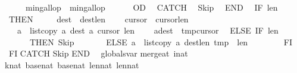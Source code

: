 \begin{isabellebody}
\ \ \ \ \ \ {\isasymacute}min{\isacharunderscore}gallop\ {\isacharcolon}{\isacharequal}{\isacharequal}\ {\isasymacute}min{\isacharunderscore}gallop\ {\isacharplus}\ {}\isanewline
\ \ \ \ OD\isanewline
\ \ CATCH\isanewline
\ \ Skip\isanewline
\ \ END{\isacharsemicolon}{\isacharsemicolon}\isanewline
\ \ IF\ {\isasymacute}len{}\ {\isacharequal}\ {}\isanewline
\ \ THEN\ \isanewline
\ \ \ \ {\isasymacute}dest\ {\isacharcolon}{\isacharequal}{\isacharequal}\ {\isasymacute}dest{\isacharminus}{\isasymacute}len{}{\isacharsemicolon}{\isacharsemicolon}\isanewline
\ \ \ \ {\isasymacute}cursor{}\ {\isacharcolon}{\isacharequal}{\isacharequal}\ {\isasymacute}cursor{}{\isacharminus}{\isasymacute}len{}{\isacharsemicolon}{\isacharsemicolon}\isanewline
\ \ \ \ {\isasymacute}a\ {\isacharcolon}{\isacharequal}{\isacharequal}\ list{\isacharunderscore}copy\ {\isasymacute}a\ {\isacharparenleft}{\isasymacute}dest{\isacharplus}{}{\isacharparenright}\ {\isasymacute}a\ {\isacharparenleft}{\isasymacute}cursor{}{\isacharplus}{}{\isacharparenright}\ {\isasymacute}len{}{\isacharsemicolon}{\isacharsemicolon}\isanewline
\ \ \ \ {\isasymacute}a{\isacharbang}{\isasymacute}dest\ {\isacharcolon}{\isacharequal}{\isacharequal}\ {\isasymacute}tmp{\isacharbang}{\isasymacute}cursor{}\isanewline
\ \ ELSE\ IF\ {\isasymacute}len{}\ {\isacharequal}\ {}\isanewline
\ \ \ \ \ \ \ THEN\ Skip\isanewline
\ \ \ \ \ \ \ ELSE\ {\isasymacute}a\ {\isacharcolon}{\isacharequal}{\isacharequal}\ list{\isacharunderscore}copy\ {\isasymacute}a\ {\isacharparenleft}{\isasymacute}dest{\isacharminus}{\isacharparenleft}{\isasymacute}len{}{\isacharminus}{}{\isacharparenright}{\isacharparenright}\ {\isasymacute}tmp\ {}\ {\isasymacute}len{}\ \isanewline
\ \ \ \ \ \ \ FI\isanewline
\ \ FI\isanewline
CATCH\isanewline
Skip\isanewline
END\isanewline
{\isachardoublequoteclose}\isanewline
\isanewline
{}\isamarkupfalse%
\ {\isacharparenleft}\ globals{\isacharunderscore}var{\isacharparenright}\isanewline
merge{\isacharunderscore}at\ {\isacharparenleft}i{\isacharcolon}{\isacharcolon}nat{\isacharparenright}\isanewline
{}\ k{\isacharcolon}{\isacharcolon}nat\ base{}{\isacharcolon}{\isacharcolon}nat\ base{}{\isacharcolon}{\isacharcolon}nat\ len{}{\isacharcolon}{\isacharcolon}nat\ len{}{\isacharcolon}{\isacharcolon}nat\ \isanewline

\end{isabellebody}
